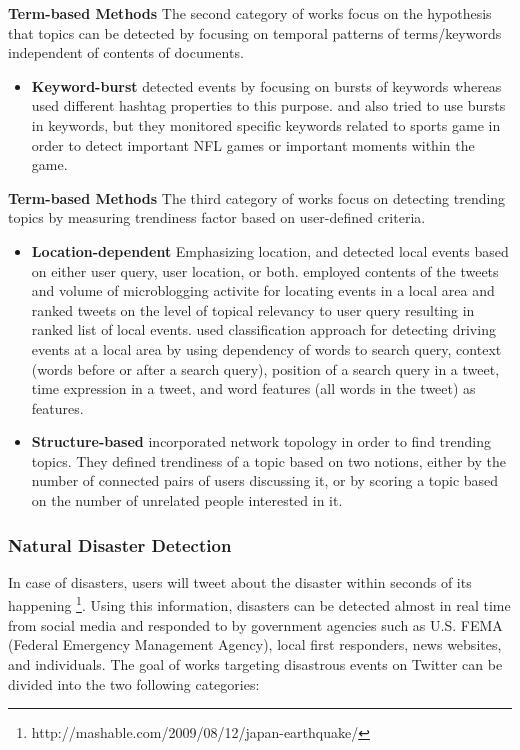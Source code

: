 \documentclass[11pt,a4paper]{article}
\begin{document}
\textbf{Term-based Methods} The second category of works focus on the hypothesis that topics can be detected by focusing on temporal patterns of terms/keywords independent of contents of documents.
\begin{itemize}
\item \textbf{Keyword-burst} \citet{mathioudakis} detected events by focusing on bursts of keywords whereas \citet{cuiZhang} used different hashtag properties to this purpose. \citet{zhaoSports} and \citet{nichols} also tried to use bursts in keywords, but they monitored specific keywords related to sports game in order to detect important NFL games or important moments within the game.
\end{itemize}
\textbf{Term-based Methods} The third category of works focus on detecting trending topics by measuring trendiness factor based on user-defined criteria.
\begin{itemize}
\item \textbf{Location-dependent} Emphasizing location, \citet{albakour} and \citet{sakakiDrive} detected local events based on either user query, user location, or both. \citeauthor{albakour} employed contents of the tweets and volume of microblogging activite for locating events in a local area and ranked tweets on the level of topical relevancy to user query resulting in ranked list of local events. \citeauthor{sakakiDrive} used classification approach for detecting driving events at a local area by using dependency of words to search query, context (words before or after a search query), position of a search query in a tweet, time expression in a tweet, and word features (all words in the tweet) as features. %
\item \textbf{Structure-based} \citet{budak} incorporated network topology in order to find trending topics. They defined trendiness of a topic based on two notions, either by the number of connected pairs of users discussing it, or by scoring a topic based on the number of unrelated people interested in it. 
\end{itemize}

\subsubsection{Natural Disaster Detection}

In case of disasters, users will tweet about the disaster within seconds of its happening \footnote{http://mashable.com/2009/08/12/japan-earthquake/}. Using this information, disasters can be detected almost in real time from social media and responded to by government agencies such as U.S. FEMA (Federal Emergency Management Agency), local first responders, news websites, and individuals. The goal of works targeting disastrous events on Twitter can be divided into the two following categories:
\end{document}
